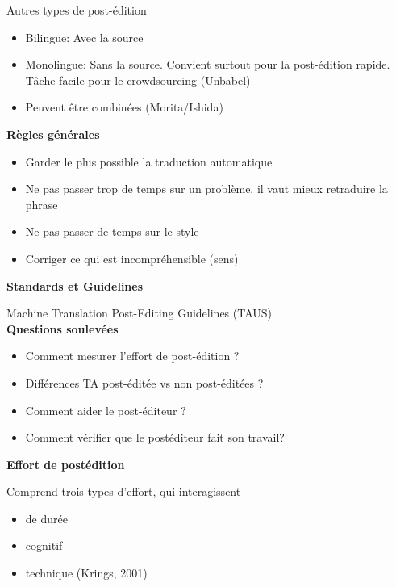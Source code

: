 Autres types de post-édition

\begin{itemize}
    \item Bilingue: Avec la source
    \item Monolingue: Sans la source. Convient surtout pour la post-édition rapide. Tâche facile pour le crowdsourcing (Unbabel)
    \item Peuvent être combinées (Morita/Ishida)\\
\end{itemize}

\newpage

\textbf{Règles générales}

\begin{itemize}
    \item Garder le plus possible la traduction automatique
    \item Ne pas passer trop de temps sur un problème, il vaut mieux retraduire la phrase
    \item Ne pas passer de temps sur le style
    \item Corriger ce qui est incompréhensible (sens)\\
\end{itemize}

\textbf{Standards et Guidelines}

Machine Translation Post-Editing Guidelines (TAUS)\\

\textbf{Questions soulevées}

\begin{itemize}
    \item Comment mesurer l’effort de post-édition ?
    \item Différences TA post-éditée vs non post-éditées ?
    \item Comment aider le post-éditeur ?
    \item Comment vérifier que le postéditeur fait son travail?\\
\end{itemize}

\textbf{Effort de postédition}

Comprend trois types d’effort, qui interagissent

\begin{itemize}
    \item de durée
    \item cognitif
    \item technique (Krings, 2001)\\
\end{itemize}


